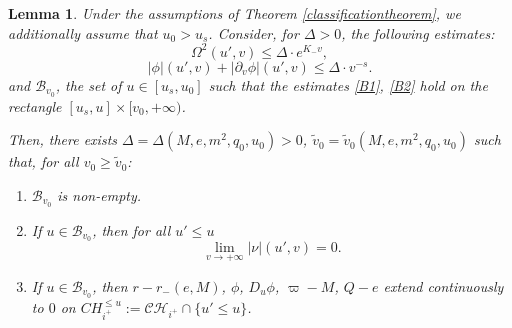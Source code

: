 \documentclass[10pt,a4paper]{article}
\theoremstyle{plain}
\newtheorem{lem}[thm]{Lemma}
\theoremstyle{remark}
\theoremstyle{definition}
\theoremstyle{plain}
\theoremstyle{remark}
\theoremstyle{definition}
\newcommand{\CH}{\mathcal{CH}_{i^+}}
\numberwithin{equation}{section}
\begin{document}
\begin{lem} \label{propagation} Under the assumptions of Theorem \ref{classificationtheorem}, we additionally assume that $u_0 >u_s$. Consider, for $\Delta>0$, the following estimates: \begin{equation}\label{B1}
	\Omega^2(u',v) \leq  \Delta \cdot e^{K_- v}, \end{equation}  \begin{equation} \label{B2}
	| \phi|(u',v) 	+	|\partial_v \phi|(u',v) \leq  \Delta \cdot v^{-s}.
	\end{equation} and $\mathcal{B}_{v_0}$, the set of $u \in [u_s,u_0]$ such that the estimates \eqref{B1}, \eqref{B2} hold on the rectangle $[u_s,u] \times [v_0,+\infty)$. 
	
	Then, there exists $\Delta=\Delta(M,e,m^2,q_0,u_0)>0$, $\tilde{v}_0=\tilde{v}_0(M,e,m^2,q_0,u_0)$ such that, for all $v_0 \geq \tilde{v}_0$: \begin{enumerate}
		\item \label{firstlemma} $\mathcal{B}_{v_0}$ is non-empty.
		\item \label{secondlemma}  If $u \in \mathcal{B}_{v_0}$, then for all $u' \leq u$
		$$\lim_{v \rightarrow +\infty}|\nu|(u',v)=0.$$
		\item  \label{thirdlemma}  If $u \in \mathcal{B}_{v_0}$, then $r-r_-(e,M)$, $\phi$, $D_u \phi$, $\varpi-M$, $Q-e$ extend continuously to $0$ on $CH^{\leq u}_{i^+}:=\CH \cap \{ u' \leq u\}$.
		

\end{enumerate}
\end{lem}
\end{document}
